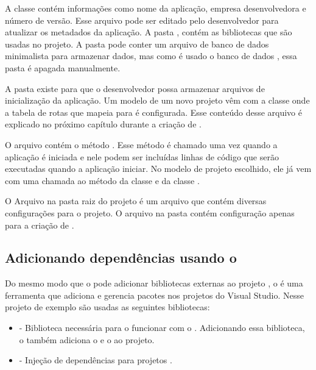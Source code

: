 A classe  contém informações como nome da aplicação, empresa desenvolvedora e número de versão. Esse arquivo pode ser editado pelo desenvolvedor para atualizar os metadados da aplicação. A pasta , contém as bibliotecas que são usadas no projeto. A pasta  pode conter um arquivo de banco de dados minimalista para armazenar dados, mas como é usado o banco de dados , essa pasta é apagada manualmente.

A pasta  existe para que o desenvolvedor possa armazenar arquivos de inicialização da aplicação. Um modelo de um novo projeto \anmvc vêm com a classe  onde a tabela de rotas que mapeia  para  é configurada. Esse conteúdo desse arquivo é explicado no próximo capítulo durante a criação de .

O arquivo  contém o método . Esse método é chamado uma vez quando a aplicação é iniciada e nele podem ser incluídas linhas de código que serão executadas quando a aplicação iniciar. No modelo de projeto escolhido, ele já vem com uma chamada ao método  da classe  e  da classe .

O Arquivo  na pasta raiz do projeto é um arquivo  que contém diversas configurações para o projeto. O arquivo  na pasta  contém configuração apenas para a criação de .

\subsection{Adicionando dependências usando o }

Do mesmo modo que o  pode adicionar bibliotecas externas ao projeto , o  é uma ferramenta que adiciona e gerencia pacotes nos projetos do Visual Studio. Nesse projeto de exemplo são usadas as seguintes bibliotecas:

\begin{itemize}
  \item {} - Biblioteca necessária para o  funcionar com o . Adicionando essa biblioteca, o  também adiciona o  e o  ao projeto.
  \item {} - Injeção de dependências para projetos \anmvc. 
\end{itemize}

